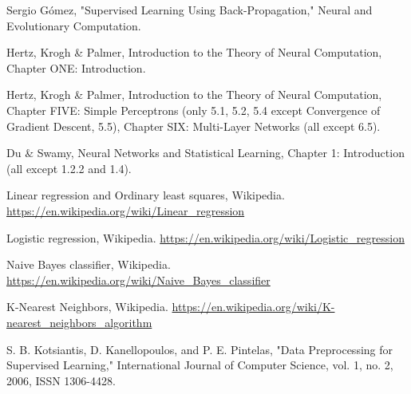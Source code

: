 \documentclass[11pt, a4paper]{article}
\begin{document}
\begin{thebibliography}{11}

Sergio Gómez, "Supervised Learning Using Back-Propagation," Neural and Evolutionary Computation. 

Hertz, Krogh \& Palmer, Introduction to the Theory of Neural Computation, Chapter ONE: Introduction.

Hertz, Krogh \& Palmer, Introduction to the Theory of Neural Computation, Chapter FIVE: Simple Perceptrons (only 5.1, 5.2, 5.4 except Convergence of Gradient Descent, 5.5), Chapter SIX: Multi-Layer Networks (all except 6.5).

Du \& Swamy, Neural Networks and Statistical Learning, Chapter 1: Introduction (all except 1.2.2 and 1.4).

Linear regression and Ordinary least squares, Wikipedia. \url{https://en.wikipedia.org/wiki/Linear_regression}

Logistic regression, Wikipedia. \url{https://en.wikipedia.org/wiki/Logistic_regression}

Naive Bayes classifier, Wikipedia. \url{https://en.wikipedia.org/wiki/Naive_Bayes_classifier}

K-Nearest Neighbors, Wikipedia. \url{https://en.wikipedia.org/wiki/K-nearest_neighbors_algorithm}

S. B. Kotsiantis, D. Kanellopoulos, and P. E. Pintelas, "Data Preprocessing for Supervised Learning," International Journal of Computer Science, vol. 1, no. 2, 2006, ISSN 1306-4428.







\end{thebibliography}
\end{document}

